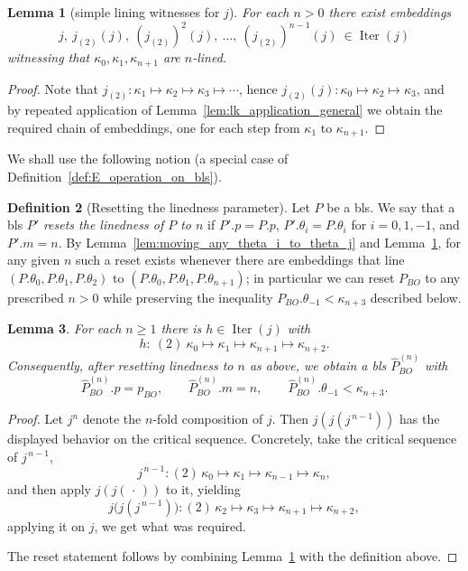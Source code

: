 \documentclass{article}
\newtheorem{lemma}{Lemma}[section]
\theoremstyle{definition}
\newtheorem{definition}[lemma]{Definition}
\theoremstyle{remark}
\DeclareMathOperator{\Iter}{Iter}
\begin{document}
\begin{lemma}[simple lining witnesses for $j$]\label{lem:simple_n_lined}
For each $n>0$ there exist embeddings
\[
j,\ j_{(2)}(j),\ (j_{(2)})^2(j),\ \ldots,\ (j_{(2)})^{n-1}(j)\ \in \Iter(j)
\]
witnessing that $\kappa_0,\kappa_1,\kappa_{n+1}$ are $n$-lined.
\end{lemma}

\begin{proof}
Note that $j_{(2)}:\kappa_1\mapsto\kappa_2\mapsto\kappa_3\mapsto\cdots$, hence $j_{(2)}(j):\kappa_0\mapsto\kappa_2\mapsto\kappa_3$, and by repeated application of Lemma~\ref{lem:lk_application_general} we obtain the required chain of embeddings, one for each step from $\kappa_1$ to $\kappa_{n+1}$.
\end{proof}

We shall use the following notion (a special case of Definition~\ref{def:E_operation_on_bls}).

\begin{definition}[Resetting the linedness parameter]
Let $P$ be a bls. We say that a bls $P'$ \emph{resets the linedness of $P$ to $n$} if $P'.p=P.p$, $P'.\theta_i=P.\theta_i$ for $i=0,1,-1$, and $P'.m=n$. By Lemma~\ref{lem:moving_any_theta_i_to_theta_j} and Lemma~\ref{lem:simple_n_lined}, for any given $n$ such a reset exists whenever there are embeddings that line $(P.\theta_0,P.\theta_1,P.\theta_2)$ to $(P.\theta_0,P.\theta_1,P.\theta_{n+1})$; in particular we can reset $P_{BO}$ to any prescribed $n>0$ while preserving the inequality $P_{BO}.\theta_{-1}<\kappa_{n+3}$ described below.
\end{definition}

\begin{lemma}\label{lem:move_kappa_nplus3}
For each $n\ge 1$ there is $h\in \Iter(j)$ with
\[
h:\ (2)\ \kappa_0 \mapsto \kappa_1 \mapsto \kappa_{n+1} \mapsto \kappa_{n+2}.
\]
Consequently, after resetting linedness to $n$ as above, we obtain a bls $\widehat P_{BO}^{(n)}$ with
\[
\widehat P_{BO}^{(n)}.p=p_{BO},\qquad \widehat P_{BO}^{(n)}.m=n,\qquad \widehat P_{BO}^{(n)}.\theta_{-1}<\kappa_{n+3}.
\]
\end{lemma}

\begin{proof}
Let $j^{n}$ denote the $n$-fold composition of $j$. Then $j(j(j^{\,n-1}))$ has the displayed behavior on the critical sequence. Concretely, take the critical sequence of \(j^{\,n-1}\),
\[
  j^{\,n-1}:(2)\,\kappa_0 \mapsto \kappa_1 \mapsto \kappa_{n-1} \mapsto \kappa_n,
\]
and then apply \(j(j(\,\cdot\,))\) to it, yielding
\[
  j\bigl(j(j^{\,n-1})\bigr):(2)\,\kappa_2 \mapsto \kappa_3 \mapsto \kappa_{n+1} \mapsto \kappa_{n+2},
\]
applying it on $j$, we get what was required. 

The reset statement follows by combining Lemma~\ref{lem:simple_n_lined} with the definition above. 
\end{proof}
\end{document}
